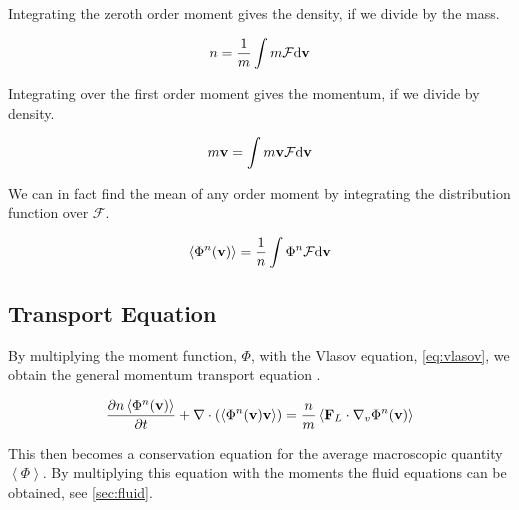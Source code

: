 	Integrating the zeroth order moment gives the density, if we divide by the
	mass.

	\begin{equation}
			n = \frac{1}{m}\int m \mathcal{F} \dd\vb{v}
	\end{equation}

	Integrating over the first order moment gives the momentum, if we divide
	by density.

	\begin{equation}
			m\vb{v} = \int m \vb{v} \mathcal{F} \dd\vb{v}
	\end{equation}

	We can in fact find the mean of any order moment by integrating the
	distribution function over \(\mathcal{F}\).

	\begin{equation}
		\left< \Phi^n(\vb{v}) \right> = \frac{1}{n} \int \Phi^n \mathcal{F} \dd\vb{v}
	\end{equation}

\subsection{Transport Equation}
	By multiplying the moment function, \( \Phi \), with the Vlasov equation, \cref{eq:vlasov},
	we obtain the general momentum transport equation \citep{shu_physics_2010}.

	\begin{equation}
		\pdv{n\left< \Phi^n(\vb{v}) \right>}{t} + \nabla \cdot \left( \left< \Phi^n(\vb{v})\vb{v} \right> \right)
		= \frac{n}{m} \left< \vb{F}_L \cdot \nabla_v \Phi^n(\vb{v}) \right>
	\end{equation}

	This then becomes a conservation equation for the average macroscopic quantity
	\(\left< \Phi \right>\). By multiplying this equation with the moments the fluid
	equations can be obtained, see \cref{sec:fluid}.






